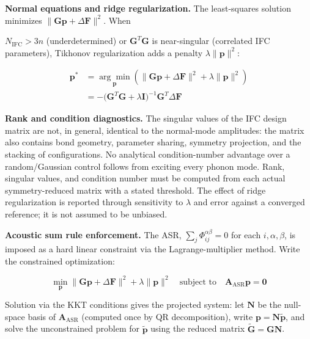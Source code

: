 \documentclass[aps,prb,reprint,amsmath,amssymb,floatfix]{revtex4-2}
\begin{document}
\color{revisionblue}
\textbf{Normal equations and ridge regularization.} The least-squares solution
minimizes \(\|\mathbf G\mathbf p+\Delta\mathbf F\|^2\). When
\color{black}

\color{revisionblue}
\(N_\text{IFC} > 3n\) (underdetermined) or \(\mathbf{G}^T\mathbf{G}\) is
near-singular (correlated IFC parameters), Tikhonov regularization adds
a penalty \(\lambda\|\mathbf{p}\|^2\):
\color{black}

\color{revisionblue}
\begin{align*}
\mathbf{p}^*
  &= \underset{\mathbf{p}}{\arg\min}\left(\|\mathbf{G}\mathbf{p}
      +\Delta\mathbf{F}\|^2+\lambda\|\mathbf{p}\|^2\right) \\
  &= -\bigl(\mathbf{G}^T\mathbf{G}+\lambda\mathbf{I}\bigr)^{-1}
      \mathbf{G}^T\Delta\mathbf{F}
\end{align*}
\color{black}

\color{revisionblue}
\textbf{Rank and condition diagnostics.} The singular values of the IFC design
matrix are not, in general, identical to the normal-mode amplitudes: the matrix
also contains bond geometry, parameter sharing, symmetry projection, and the
stacking of configurations. No analytical condition-number advantage over a
random/Gaussian control follows from exciting every phonon mode. Rank,
singular values, and condition number must be computed from each actual
symmetry-reduced matrix with a stated threshold. The effect of ridge
regularization is reported through sensitivity to \(\lambda\) and error against
a converged reference; it is not assumed to be unbiased.
\color{black}

\textbf{Acoustic sum rule enforcement.} The ASR,
\(\sum_j\Phi_{ij}^{\alpha\beta} = 0\) for each \(i,\alpha,\beta\), is
imposed as a hard linear constraint via the Lagrange-multiplier method.
Write the constrained optimization:

\color{revisionblue}
\begin{equation*}
\min_\mathbf{p}\|\mathbf{G}\mathbf{p}+\Delta\mathbf{F}\|^2
+\lambda\|\mathbf{p}\|^2
\quad\text{subject to}\quad
\mathbf{A}_\text{ASR}\mathbf{p}=\mathbf{0}
\end{equation*}
\color{black}

Solution via the KKT conditions gives the projected system: let
\(\mathbf{N}\) be the null-space basis of \(\mathbf{A}_\text{ASR}\)
(computed once by QR decomposition), write
\(\mathbf{p} = \mathbf{N}\tilde{\mathbf{p}}\), and solve the
unconstrained problem for \(\tilde{\mathbf{p}}\) using the reduced
matrix \(\tilde{\mathbf{G}} = \mathbf{G}\mathbf{N}\).
\end{document}
